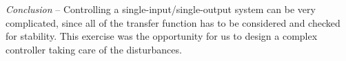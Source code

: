 \vspace{.5cm}
\hrulefill
\vspace{.5cm}

\begin{bfseries}
\emph{Conclusion} -- Controlling a single-input/single-output system can be very complicated, since all of the transfer function has to be considered and checked for stability. 
This exercise was the opportunity for us to design a complex controller taking care of the disturbances. 
\end{bfseries}
